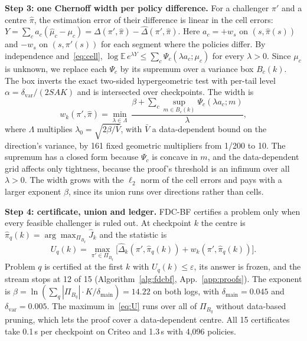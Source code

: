 \documentclass[sigconf,anonymous,review]{acmart}
\newcommand{\eps}{\varepsilon}
\newcommand{\dmain}{\delta_{\text{main}}}
\newcommand{\dvar}{\delta_{\text{var}}}
\begin{document}
\textbf{Step 3: one Chernoff width per policy difference.} For a challenger $\pi'$ and a centre $\hat\pi$, the estimation error of their difference is linear in the cell errors: $Y = \sum_c a_c(\hat\mu_c - \mu_c) = \Delta(\pi',\hat\pi) - \hat\Delta(\pi',\hat\pi)$. Here $a_c = +w_s$ on $(s, \hat\pi(s))$ and $-w_s$ on $(s, \pi'(s))$ for each segment where the policies differ. By independence and~\eqref{eq:cell}, $\log \mathbb{E}\, e^{\lambda Y} \le \sum_c \Psi_c(\lambda a_c; \mu_c)$ for every $\lambda > 0$. Since $\mu_c$ is unknown, we replace each $\Psi_c$ by its supremum over a variance box $B_c(k)$. The box inverts the exact two-sided hypergeometric test with per-tail level $\alpha = \dvar/(2SAK)$ and is intersected over checkpoints. The width is
\begin{equation}\label{eq:width}
w_k(\pi',\hat\pi) = \min_{\lambda \in \Lambda}\ \frac{\beta + \sum_c \sup_{m \in B_c(k)} \Psi_c(\lambda a_c; m)}{\lambda},
\end{equation}
where $\Lambda$ multiplies $\lambda_0 = \sqrt{2\beta/\bar V}$, with $\bar V$ a data-dependent bound on the direction's variance, by 161 fixed geometric multipliers from 1/200 to 10. The supremum has a closed form because $\Psi_c$ is concave in $m$, and the data-dependent grid affects only tightness, because the proof's threshold is an infimum over all $\lambda > 0$. The width grows with the $\ell_2$ norm of the cell errors and pays with a larger exponent $\beta$, since its union runs over directions rather than cells.

\textbf{Step 4: certificate, union and ledger.} FDC-BF certifies a problem only when every feasible challenger is ruled out. At checkpoint $k$ the centre is $\hat\pi_q(k) = \arg\max_{\Pi_{B_q}} \hat J_k$ and the statistic is
\begin{equation}\label{eq:U}
U_q(k) = \max_{\pi' \in \Pi_{B_q}}\big[\hat\Delta_k(\pi', \hat\pi_q(k)) + w_k(\pi', \hat\pi_q(k))\big].
\end{equation}
Problem $q$ is certified at the first $k$ with $U_q(k) \le \eps$, its answer is frozen, and the stream stops at 12 of 15 (Algorithm~\ref{alg:fdcbf}, App.~\ref{app:proofs}). The exponent is $\beta = \ln(\sum_q |\Pi_{B_q}| \cdot K/\dmain) = 14.22$ on both logs, with $\dmain = 0.045$ and $\dvar = 0.005$. The maximum in~\eqref{eq:U} runs over all of $\Pi_{B_q}$ without data-based pruning, which lets the proof cover a data-dependent centre. All 15 certificates take 0.1\,s per checkpoint on Criteo and 1.3\,s with 4,096 policies.

\end{document}
